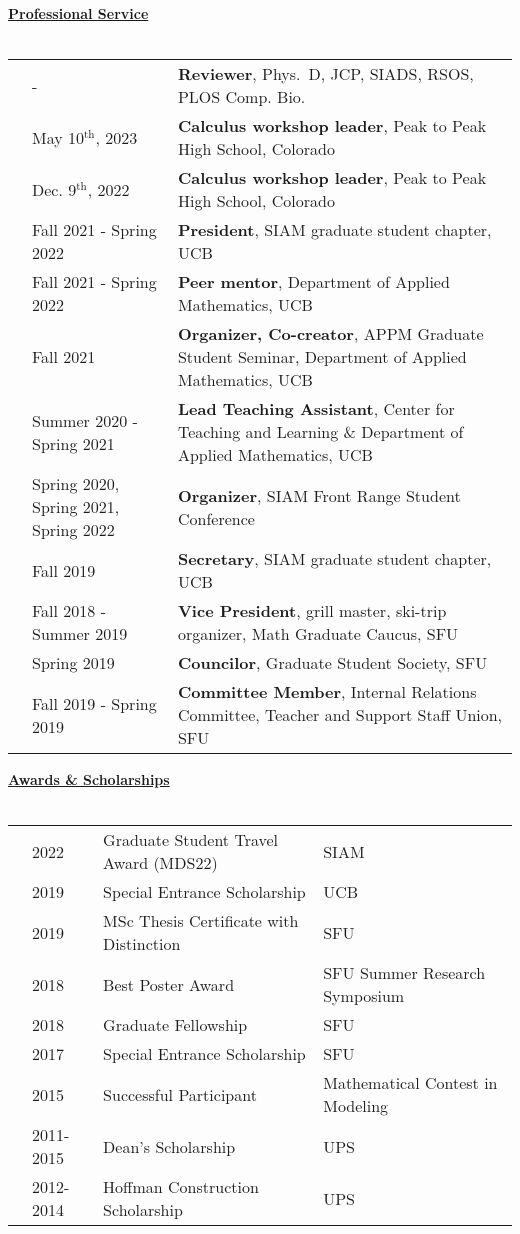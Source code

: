 \documentclass[letterpaper,11pt,oneside]{article}
\newcommand{\headr}[1]{\vspace{10pt}\uline{\Large{\textbf{#1}} \hfill } \\ \vspace{-10pt}\\}
\begin{document}
\headr{Professional Service}

\begin{tabular}{@{} p{0.01cm} p{4.5cm} p{12cm}}
& - & {\bf Reviewer}, Phys.\ D, JCP, SIADS, RSOS, PLOS Comp. Bio.\\
& May 10$^\text{th}$, 2023 & {\bf Calculus workshop leader}, Peak to Peak High School, Colorado \\ 
& Dec. 9$^\text{th}$, 2022 & {\bf Calculus workshop leader}, Peak to Peak High School, Colorado \\ 
& Fall 2021 - Spring 2022 & \textbf{President}, SIAM graduate student chapter, UCB\\
& Fall 2021 - Spring 2022  & \textbf{Peer mentor}, Department of Applied Mathematics, UCB\\
& Fall 2021  & \textbf{Organizer, Co-creator}, APPM Graduate Student Seminar, Department of Applied Mathematics, UCB\\
& Summer 2020 - Spring 2021 & \textbf{Lead Teaching Assistant}, Center for Teaching and Learning \& Department of Applied Mathematics, UCB\\
& Spring 2020, Spring 2021, Spring 2022  & \textbf{Organizer}, SIAM Front Range Student Conference \\
& Fall 2019  & \textbf{Secretary}, SIAM graduate student chapter, UCB\\
& Fall 2018 - Summer 2019 & \textbf{Vice President}, grill master, ski-trip organizer, Math Graduate Caucus, SFU\\
& Spring 2019 & \textbf{Councilor}, Graduate Student Society, SFU\\
& Fall 2019 - Spring 2019 & \textbf{Committee Member}, Internal Relations Committee, Teacher and Support Staff Union, SFU \\
\end{tabular}

\headr{Awards \& Scholarships}

\begin{tabular}{@{} p{0.01cm} p{2cm} p{9cm} p{8cm}}
& 2022 & Graduate Student Travel Award (MDS22) & SIAM \\
& 2019 & Special Entrance Scholarship & UCB \\
& 2019 & MSc Thesis Certificate with Distinction & SFU \\
& 2018 & Best Poster Award & SFU Summer Research Symposium \\
& 2018 & Graduate Fellowship & SFU \\
& 2017 & Special Entrance Scholarship & SFU \\
& 2015 & Successful Participant & Mathematical Contest in Modeling \\
& 2011-2015 & Dean’s Scholarship & UPS\\
& 2012-2014 & Hoffman Construction Scholarship & UPS\\ 
\end{tabular}
\end{document}

